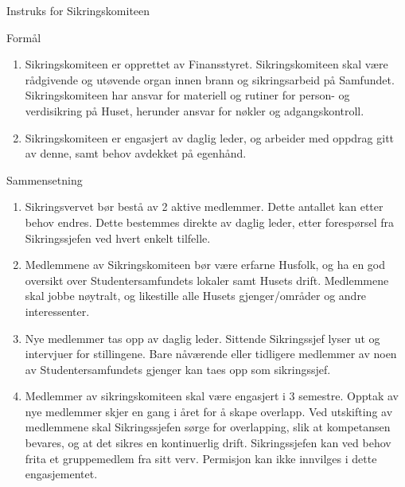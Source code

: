 \begin{instruks}{Instruks for Sikringskomiteen}{}{}
    \begin{instruksledd}{Formål}
        \begin{enumerate}
            \item  Sikringskomiteen er opprettet av Finansstyret. Sikringskomiteen skal
                være rådgivende og utøvende organ
                innen brann og sikringsarbeid på Samfundet. Sikringskomiteen har ansvar
                for materiell og rutiner for person-
                og verdisikring på Huset, herunder ansvar for nøkler og adgangskontroll.
            \item Sikringskomiteen er engasjert av daglig leder, og arbeider med oppdrag
                gitt av denne, samt behov avdekket
                på egenhånd.
        \end{enumerate}
    \end{instruksledd}

    \begin{instruksledd}{Sammensetning}
        \begin{enumerate}
            \item Sikringsvervet bør bestå av 2 aktive medlemmer. Dette antallet kan etter behov
                endres. Dette bestemmes
                direkte av daglig leder, etter forespørsel fra Sikringssjefen ved hvert enkelt
                tilfelle.
            \item Medlemmene av Sikringskomiteen bør være erfarne Husfolk, og ha en god oversikt over
                Studentersamfundets lokaler samt Husets drift. Medlemmene skal jobbe nøytralt, og
                likestille alle Husets
                gjenger/områder og andre interessenter.
            \item Nye medlemmer tas opp av daglig leder. Sittende Sikringssjef lyser ut og intervjuer
                for stillingene. Bare
                nåværende eller tidligere medlemmer av noen av Studentersamfundets gjenger kan taes
                opp som sikringssjef.
            \item Medlemmer av sikringskomiteen skal være engasjert i 3 semestre. Opptak av nye
                medlemmer skjer en gang i
                året for å skape overlapp. Ved utskifting av medlemmene skal Sikringssjefen sørge for
                overlapping, slik at
                kompetansen bevares, og at det sikres en kontinuerlig drift. Sikringssjefen kan ved
                behov frita et
                gruppemedlem fra sitt verv. Permisjon kan ikke innvilges i dette engasjementet.
        \end{enumerate}
    \end{instruksledd}


\end{instruks}
